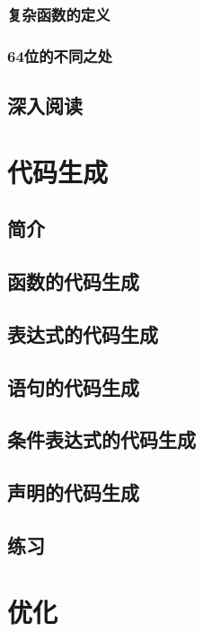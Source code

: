 \documentclass[cn,11pt,chinese]{elegantbook}
\begin{document}
\subsection{复杂函数的定义}

\subsection{64位的不同之处}

\section{深入阅读}

\chapter{代码生成}

\section{简介}

\section{函数的代码生成}

\section{表达式的代码生成}

\section{语句的代码生成}

\section{条件表达式的代码生成}

\section{声明的代码生成}

\section{练习}

\chapter{优化}
\end{document}
